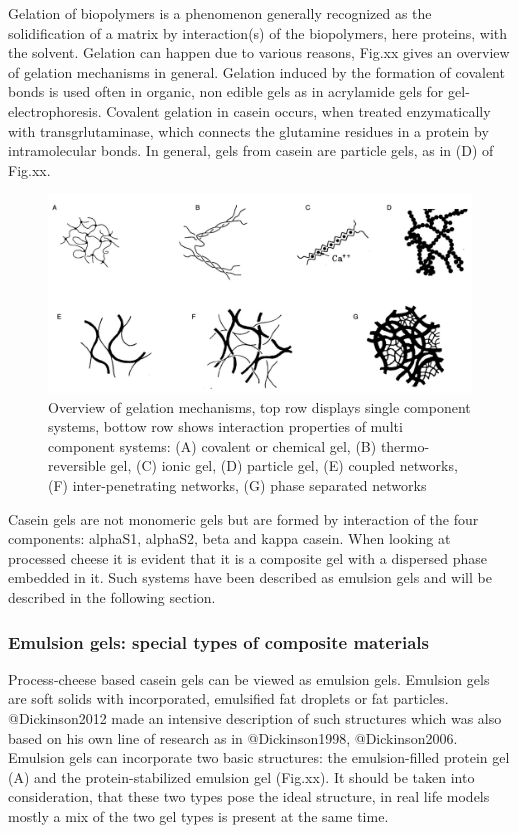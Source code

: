 \documentclass[
]{article}
\begin{document}
Gelation of biopolymers is a phenomenon generally recognized as the
solidification of a matrix by interaction(s) of the biopolymers, here
proteins, with the solvent. Gelation can happen due to various reasons,
Fig.xx gives an overview of gelation mechanisms in general. Gelation
induced by the formation of covalent bonds is used often in organic, non
edible gels as in acrylamide gels for gel-electrophoresis. Covalent
gelation in casein occurs, when treated enzymatically with
transgrlutaminase, which connects the glutamine residues in a protein by
intramolecular bonds. In general, gels from casein are particle gels, as
in (D) of Fig.xx.

\begin{figure}
\includegraphics[width=0.8\linewidth]{images/gelation_intro} \caption{Overview of gelation mechanisms, top row displays single component systems, bottow row shows interaction properties of multi component systems:  (A) covalent or chemical gel, (B) thermo-reversible gel, (C) ionic gel, (D) particle gel, (E) coupled networks, (F) inter-penetrating networks, (G) phase separated networks}\label{fig:unnamed-chunk-5}
\end{figure}

Casein gels are not monomeric gels but are formed by interaction of the
four components: alphaS1, alphaS2, beta and kappa casein. When looking
at processed cheese it is evident that it is a composite gel with a
dispersed phase embedded in it. Such systems have been described as
emulsion gels and will be described in the following section.

\subsubsection{Emulsion gels: special types of composite materials}

Process-cheese based casein gels can be viewed as emulsion gels.
Emulsion gels are soft solids with incorporated, emulsified fat droplets
or fat particles. @Dickinson2012 made an intensive description of such
structures which was also based on his own line of research as in
@Dickinson1998, @Dickinson2006. Emulsion gels can incorporate two basic
structures: the emulsion-filled protein gel (A) and the
protein-stabilized emulsion gel (Fig.xx). It should be taken into
consideration, that these two types pose the ideal structure, in real
life models mostly a mix of the two gel types is present at the same
time.
\end{document}
